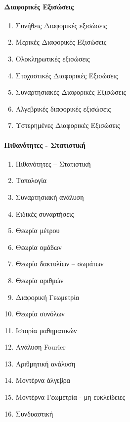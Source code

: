 \documentclass[twoside,nofonts,internet,shmeiwseis]{thewria}
\begin{document}
\paragraph{Διαφορικές Εξισώσεις}
\begin{enumerate}[resume]
\item Συνήθεις Διαφορικές εξισώσεις
\item Μερικές Διαφορικές Εξισώσεις
\item Ολοκληρωτικές εξισώσεις
\item Στοχαστικές Διαφορικές Εξισώσεις
\item Συναρτησιακές Διαφορικές Εξισώσεις
\item Αλγεβρικές διαφορικές εξισώσεις
\item Υστερημένες Διαφορικές Εξισώσεις
\end{enumerate}
\paragraph{Πιθανότητες - Στατιστική}
\begin{enumerate}[resume]
\item Πιθανότητες – Στατιστική
\item Τοπολογία
\item Συναρτησιακή ανάλυση
\item Ειδικές συναρτήσεις
\item Θεωρία μέτρου
\item Θεωρία ομάδων
\item Θεωρία δακτυλίων – σωμάτων
\item Θεωρία αριθμών
\item Διαφορική Γεωμετρία
\item Θεωρία συνόλων
\item Ιστορία μαθηματικών
\item Ανάλυση Fourier
\item Αριθμητική ανάλυση
\item Μοντέρνα άλγεβρα
\item Μοντέρνα Γεωμετρία - μη ευκλείδειες
\item Συνδυαστική
\end{enumerate}
\end{document}

